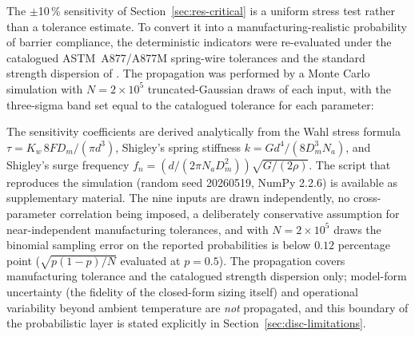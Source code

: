 The $\pm$10\,\% sensitivity of Section~\ref{sec:res-critical} is a
uniform stress test rather than a tolerance estimate. To convert it
into a manufacturing-realistic probability of barrier compliance, the
deterministic indicators were re-evaluated under the catalogued
ASTM~A877/A877M spring-wire tolerances and the standard strength
dispersion of \citet[\S~10-30]{shigley2020}. The propagation was
performed by a Monte Carlo simulation \citep{umaras2021tolerance} with
$N=2\times 10^{5}$ truncated-Gaussian draws of each input, with the three-sigma band set
equal to the catalogued tolerance for each parameter:
\begin{center}
\footnotesize
\renewcommand{\arraystretch}{1.05}
\end{center}

\noindent The sensitivity coefficients are derived analytically from the
Wahl stress formula
$\tau=K_{w}\,8FD_{m}/(\pi d^{3})$, Shigley's spring stiffness
$k=Gd^{4}/(8D_{m}^{3}N_{a})$, and Shigley's surge frequency
$f_{n}=(d/(2\pi N_{a} D_{m}^{2}))\sqrt{G/(2\rho)}$. The script that
reproduces the simulation (random seed 20260519, NumPy 2.2.6) is
available as supplementary material. The nine inputs are drawn
independently, no cross-parameter correlation being imposed, a
deliberately conservative assumption for near-independent manufacturing
tolerances, and with $N=2\times 10^{5}$ draws the binomial sampling
error on the reported probabilities is below $0.12$ percentage point
($\sqrt{p(1-p)/N}$ evaluated at $p=0.5$). The propagation covers
manufacturing tolerance and the catalogued strength dispersion only;
model-form uncertainty (the fidelity of the closed-form sizing itself)
and operational variability beyond ambient temperature are \emph{not}
propagated, and this boundary of the probabilistic layer is stated
explicitly in Section~\ref{sec:disc-limitations}.

